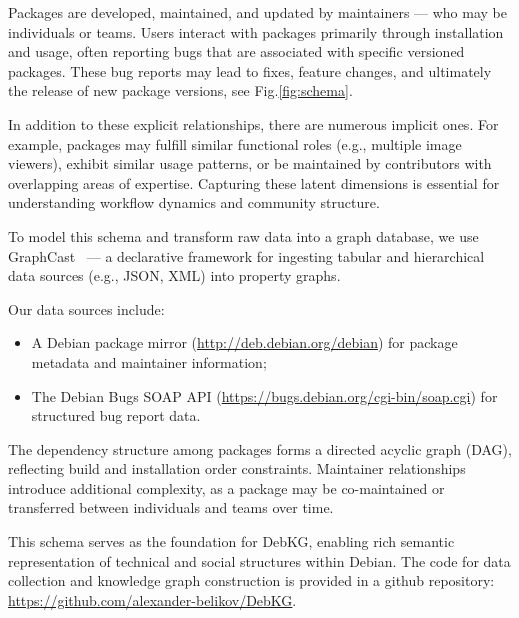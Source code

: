 \documentclass[10pt,oneside,a4paper, twocolumn]{article}
\begin{document}
    Packages are developed, maintained, and updated by maintainers — who may be individuals or teams.
    Users interact with packages primarily through installation and usage, often reporting bugs that are associated with specific versioned packages.
    These bug reports may lead to fixes, feature changes, and ultimately the release of new package versions, see Fig.\ref{fig:schema}.

    In addition to these explicit relationships, there are numerous implicit ones.
    For example, packages may fulfill similar functional roles (e.g., multiple image viewers), exhibit similar usage patterns, or be maintained by contributors with overlapping areas of expertise.
    Capturing these latent dimensions is essential for understanding workflow dynamics and community structure.

    To model this schema and transform raw data into a graph database, we use GraphCast~\cite{graphcast} — a declarative framework for ingesting tabular and hierarchical data sources (e.g., JSON, XML) into property graphs.

    Our data sources include:
    \begin{itemize}
        \item A Debian package mirror (\url{http://deb.debian.org/debian}) for package metadata and maintainer information;
        \item The Debian Bugs SOAP API (\url{https://bugs.debian.org/cgi-bin/soap.cgi}) for structured bug report data.
    \end{itemize}

    The dependency structure among packages forms a directed acyclic graph (DAG), reflecting build and installation order constraints.
    Maintainer relationships introduce additional complexity, as a package may be co-maintained or transferred between individuals and teams over time.

    This schema serves as the foundation for DebKG, enabling rich semantic representation of technical and social structures within Debian.
    The code for data collection and knowledge graph construction is provided in a github repository: \url{https://github.com/alexander-belikov/DebKG}.
\end{document}
